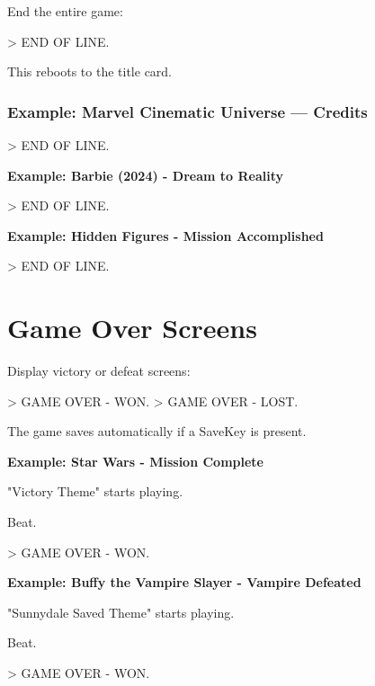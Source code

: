 \documentclass[11pt,letterpaper,oldstylefigures]{memoir}
\newcommand{\stagedir}[1]{#1\par\vspace{1\baselineskip}}
\newenvironment{FountainExample}
  {\begingroup
  \ttfamily\small
   \setlength{\parindent}{0pt}
  \setlength{\parskip}{0.5em}
  \allowdisplaybreaks
  \setlength{\displaywidowpenalty}{0}
  \setlength{\widowpenalty}{0}
  \setlength{\clubpenalty}{0}
  \setlength{\interlinepenalty}{0}
}
  {\endgroup}
\begin{document}
End the entire game:

\begin{FountainExample}
> END OF LINE.
\end{FountainExample}

This reboots to the title card.

\subsubsection{Example: Marvel Cinematic Universe — Credits}

\begin{FountainExample}
\stagedir{> END OF LINE.}
\end{FountainExample}

\textbf{Example: Barbie (2024) - Dream to Reality}
\begin{FountainExample}
\stagedir{> END OF LINE.}
\end{FountainExample}

\textbf{Example: Hidden Figures - Mission Accomplished}

\begin{FountainExample}
\stagedir{> END OF LINE.}
\end{FountainExample}

\section{Game Over Screens}

Display victory or defeat screens:

\begin{FountainExample}
> GAME OVER - WON.
> GAME OVER - LOST.
\end{FountainExample}

The game saves automatically if a SaveKey is present.

\textbf{Example: Star Wars - Mission Complete}

\begin{FountainExample}
\stagedir{"Victory Theme" starts playing.}
\stagedir{Beat.}
\stagedir{> GAME OVER - WON.}
\end{FountainExample}

\textbf{Example: Buffy the Vampire Slayer - Vampire Defeated}

\begin{FountainExample}
\stagedir{"Sunnydale Saved Theme" starts playing.}
\stagedir{Beat.}
\stagedir{> GAME OVER - WON.}
\end{FountainExample}
\end{document}
